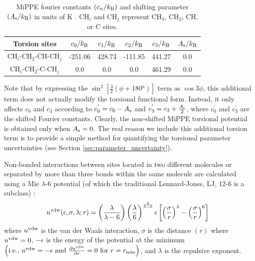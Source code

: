 \documentclass[preprint,review,12pt]{elsarticle}
\begin{document}
		
	\begin{table}[h!]
		\caption{MiPPE fourier constants $(c_n/k_{\rm B})$ and shifting parameter $(A_{\rm s}/k_{\rm B})$ in units of K \cite{Martin1999,Potoff_branched}. CH$_i$ and CH$_j$ represent CH$_3$, CH$_2$, CH, or C sites.} \label{tab:torsions}
		\begin{center}
			\begin{tabular}{|c|c|c|c|c|c|}
				\hline
				Torsion sites & $c_0/k_{\rm B}$ & $c_1/k_{\rm B}$ & $c_2/k_{\rm B}$ & $c_3/k_{\rm B}$ & $A_{\rm s}/k_{\rm B}$ \\ \hline
				CH$_i$-CH$_2$-CH-CH$_j$ & -251.06 & 428.73 & -111.85 & 441.27 & 0.0 \\
				CH$_i$-CH$_2$-C-CH$_j$ & 0.0 & 0.0 & 0.0 & 461.29 & 0.0 \\
				\hline
			\end{tabular}
		\end{center} 
	\end{table}

	Note that by expressing the $\sin^2\left[\frac{3}{2}(\phi + \ang{180})\right]$ term as $\cos{3\phi}$, this additional term does not actually modify the torsional functional form. Instead, it only affects $c_0$ and $c_3$ according to $c_0^{'} = c_0 - A_{\rm s}$ and $c_3^{'} = c_3 + \frac{A_{\rm s}}{2}$, where $c_0^{'}$ and $c_3^{'}$ are the shifted Fourier constants. Clearly, the non-shifted MiPPE torsional potential is obtained only when $A_{\rm s} = 0$. The real reason we include this additional torsion term is to provide a simple method for quantifying the torsional parameter uncertainties (see Section \ref{sec:parameter_uncertainty}). 
	
	Non-bonded interactions between sites located in two different molecules or separated by more than three bonds within the same molecule are calculated using a Mie $\lambda$-6 potential (of which the traditional Lennard-Jones, LJ, 12-6 is a subclass) \cite{Herdes2015}:
	\begin{equation} \label{eq:Mie}
	u^{\rm vdw}(\epsilon,\sigma,\lambda;r) = \left(\frac{\lambda}{\lambda - 6}\right)\left(\frac{\lambda}{6}\right)^{\frac{6}{\lambda - 6}} \epsilon \left[\left(\frac{\sigma}{r}\right)^{\lambda} - \left(\frac{\sigma}{r}\right)^6\right]
	\end{equation} 
	where $u^{\rm vdw}$ is the van der Waals interaction, $\sigma$ is the distance $(r)$ where $u^{\rm vdw} = 0$, $-\epsilon$ is the energy of the potential at the minimum $\left(\text{i.e., }u^{\rm vdw} = -\epsilon \text{ and } \frac{\partial u^{\rm vdw}}{\partial r} = 0 \text{ for } r=r_{\rm min} \right)$, and $\lambda$ is the repulsive exponent. 
	
\end{document}

